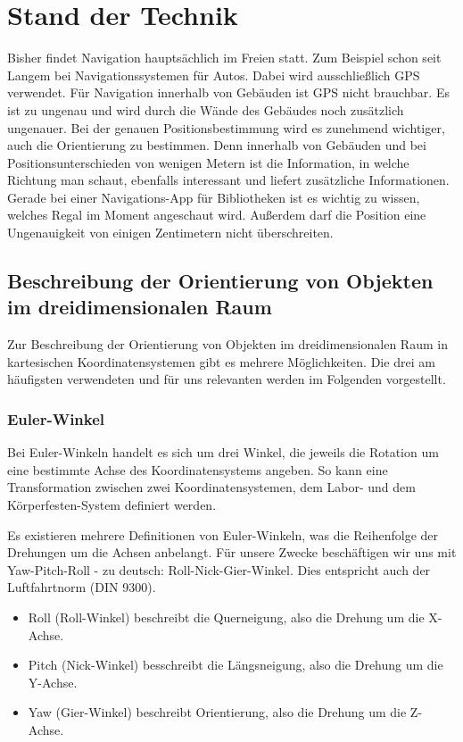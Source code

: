 
\chapter{Stand der Technik}
  \label{Stand der Technik}

\medskip
Bisher findet Navigation hauptsächlich im Freien statt. Zum Beispiel schon seit Langem bei Navigationssystemen für Autos. Dabei wird ausschließlich GPS verwendet. Für Navigation innerhalb von Gebäuden ist GPS nicht brauchbar. Es ist zu ungenau und wird durch die Wände des Gebäudes noch zusätzlich ungenauer. Bei der genauen Positionsbestimmung wird es zunehmend wichtiger, auch die Orientierung zu bestimmen. Denn innerhalb von Gebäuden und bei Positionsunterschieden von wenigen Metern ist die Information, in welche Richtung man schaut, ebenfalls interessant und liefert zusätzliche Informationen. Gerade bei einer Navigations-App für Bibliotheken ist es wichtig zu wissen, welches Regal im Moment angeschaut wird. Außerdem darf die Position eine Ungenauigkeit von einigen Zentimetern nicht überschreiten.

\section{Beschreibung der Orientierung von Objekten im dreidimensionalen Raum}
Zur Beschreibung der Orientierung von Objekten im dreidimensionalen Raum in kartesischen Koordinatensystemen gibt es mehrere Möglichkeiten. Die drei am häufigsten verwendeten und für uns relevanten werden im Folgenden vorgestellt.

\subsection{Euler-Winkel}
Bei Euler-Winkeln handelt es sich um drei Winkel, die jeweils die Rotation um eine bestimmte Achse des Koordinatensystems angeben. So kann eine Transformation zwischen zwei Koordinatensystemen, dem Labor- und dem Körperfesten-System definiert werden.

Es existieren mehrere Definitionen von Euler-Winkeln, was die Reihenfolge der Drehungen um die Achsen anbelangt. Für unsere Zwecke beschäftigen wir uns mit Yaw-Pitch-Roll - zu deutsch: Roll-Nick-Gier-Winkel. Dies entspricht auch der Luftfahrtnorm (DIN 9300).

\begin{itemize}
	\item Roll (Roll-Winkel) beschreibt die Querneigung, also die Drehung um die X-Achse.
	\item Pitch (Nick-Winkel) besschreibt die Längsneigung, also die Drehung um die Y-Achse.
	\item Yaw (Gier-Winkel) beschreibt Orientierung, also die Drehung um die Z-Achse.
\end{itemize}

